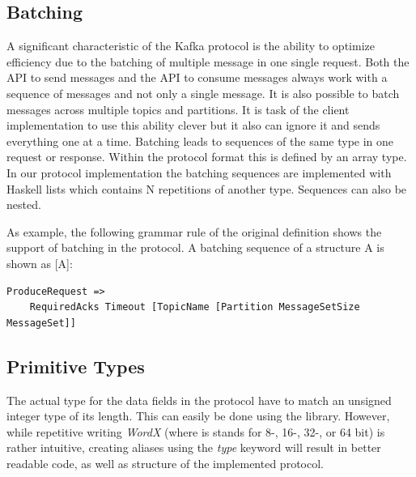 \subsection{Batching}
\label{impl-prot-batching}
A significant characteristic of the Kafka protocol is the ability to optimize
efficiency due to the batching of multiple message in one single request. Both
the API to send messages and the API to consume messages always work with a
sequence of messages and not only a single message. It is also possible to batch
messages across multiple topics and partitions. It is task of the client
implementation to use this ability clever but it also can ignore it and sends everything
one at a time. Batching leads to sequences of the same type in one request or response. Within
the protocol format this is defined by an array type. In our protocol
implementation the batching sequences are implemented with Haskell lists which
contains N repetitions of another type. Sequences can also be nested. 

As example, the following grammar rule of the original definition shows the
support of batching in the protocol. A batching sequence of a structure A is
shown as [A]:
\begin{lstlisting}
ProduceRequest => 
    RequiredAcks Timeout [TopicName [Partition MessageSetSize MessageSet]]
\end{lstlisting}

\subsection{Primitive Types}

The actual type for the data fields in the protocol have to match an unsigned
integer type of its length. This can easily be done using the
library. However, while repetitive writing \textit{WordX} (where is stands for
8-, 16-, 32-, or 64 bit) is rather intuitive, creating aliases using the
\textit{type} keyword will result in better readable code, as well as structure
of the implemented protocol. 

